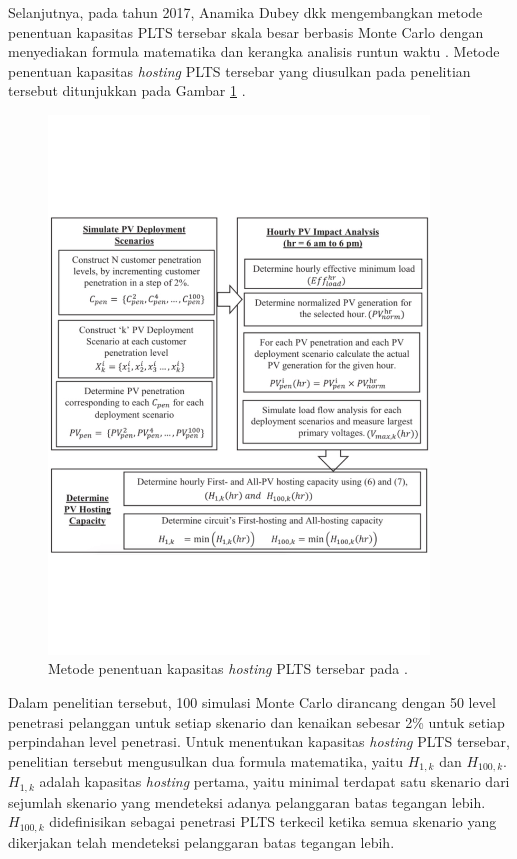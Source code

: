 {{{Selanjutnya, pada tahun 2017, Anamika Dubey dkk mengembangkan metode penentuan kapasitas PLTS tersebar skala besar berbasis Monte Carlo dengan menyediakan formula matematika dan kerangka analisis runtun waktu \cite{Dubey2017}. Metode penentuan kapasitas \textit{hosting} PLTS tersebar yang diusulkan pada penelitian tersebut ditunjukkan pada Gambar \ref{methoddubey} \cite{Dubey2017}.
\begin{figure}[!h]
	\centering
	\includegraphics[width=0.9\textwidth]{Fig/methoddubey}
	\caption{Metode penentuan kapasitas \textit{hosting} PLTS tersebar pada \cite{Dubey2017}.}
	\label{methoddubey}
\end{figure}
Dalam penelitian tersebut, 100 simulasi Monte Carlo dirancang dengan 50 level penetrasi pelanggan untuk setiap skenario dan kenaikan sebesar 2\% untuk setiap perpindahan level penetrasi. Untuk menentukan kapasitas \textit{hosting} PLTS tersebar, penelitian tersebut mengusulkan dua formula matematika, yaitu $H_{1,k}$ dan $H_{100,k}$. $H_{1,k}$ adalah kapasitas \textit{hosting} pertama, yaitu minimal terdapat satu skenario dari sejumlah skenario yang mendeteksi adanya pelanggaran batas tegangan lebih. $H_{100,k}$ didefinisikan sebagai penetrasi PLTS terkecil ketika semua skenario yang dikerjakan telah mendeteksi pelanggaran batas tegangan lebih.

}}}
